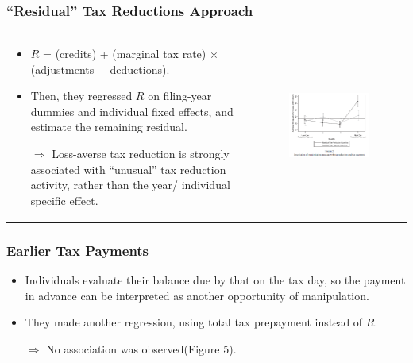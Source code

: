 \documentclass[dvipdfmx,12pt]{beamer}
\begin{document}
\begin{frame}\frametitle{``Residual'' Tax Reductions Approach}

    \begin{tabular}{lr}
      \begin{minipage}[H]{0.4\textwidth}
        \begin{itemize}
          \footnotesize
          \item $R$ = (credits) + (marginal tax rate) $\times$
          (adjustments $+$ deductions).

          \item Then, they regressed $R$ on filing-year dummies and individual fixed effects, and estimate the remaining residual.

          $\Rightarrow$ Loss-averse tax reduction is strongly associated with
          ``unusual'' tax reduction activity, rather than the year/
          individual specific effect.
        \end{itemize}
      \end{minipage} &
      \begin{minipage}[H]{0.4\textwidth}

        \begin{figure}[H]
          \includegraphics[keepaspectratio, scale =0.5]{fig_tab/ARJ_F5.png}
        \end{figure}
      \end{minipage}
    \end{tabular}
\end{frame}

\begin{frame}\frametitle{Earlier Tax Payments}
  \begin{itemize}
    \item Individuals evaluate their balance due by that on the tax day, so the payment in advance can be interpreted as another opportunity of manipulation.

    \item They made another regression, using total tax prepayment instead of $R$.

    $\Rightarrow$ No association was observed(Figure 5).
  \end{itemize}
\end{frame}
\end{document}
